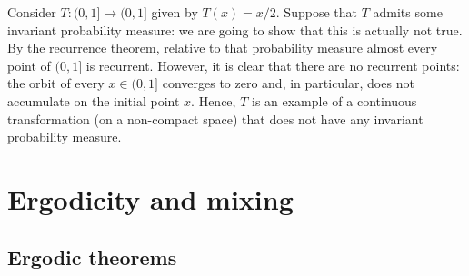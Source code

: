 \begin{example}
Consider $T:(0,1]\to (0,1]$ given by $T(x)=x/2$. Suppose that $T$ admits some invariant probability measure: we are going to show that this is actually not true. By the recurrence theorem, relative to that probability measure almost every point of $(0,1]$ is recurrent. However, it is clear that there are no recurrent points: the orbit of every $x\in(0,1]$ converges to zero and, in particular, does not accumulate on the initial point $x$. Hence, $T$ is an example of a continuous transformation (on a non-compact space) that does not have any invariant probability measure.
\end{example}
\section{Ergodicity and mixing}
\subsection{Ergodic theorems}
